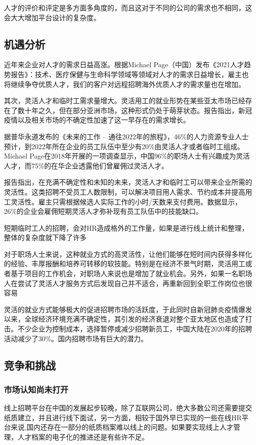 \documentclass[UTF8]{ctexart}
\begin{document}
人才的评价和评定是多方面多角度的，而且这对于不同的公司的需求也不相同，这会大大增加平台设计的复杂度。
\subsection{机遇分析}
近年来企业对人才的需求日益高涨。根据Michael Page（中国）发布《2021人才趋势报告》：技术、医疗保健与生命科学领域等领域对人才的需求日益增长，雇主也将继续争夺优质人才，我们的客户对远程招聘海外优质人才的需求量也在增加。

其次，灵活人才和临时工需求量增大。灵活用工的就业形势在某些亚太市场已经存在了数十年之久，但在部分亚洲市场，这种形式仍处于萌芽状态。报告指出，新冠疫情以及相关市场的不确定性加速了这一早存在的需求增长。

据普华永道发布的《未来的工作 – 通往2022年的旅程》，46\%的人力资源专业人士预计，到2022年所在企业的员工队伍中至少有20\%由灵活人才或者临时工组成。Michael Page在2018年开展的一项调查显示，中国96\%的职场人士有兴趣成为灵活人才，而75\%的在华企业透露他们曾雇佣过灵活人才。

报告指出，在充满不确定性和未知的未来，灵活人才和临时工可以带来企业所需的灵活性。这类招聘不受员工人数限制，可以解决项目用人需求、节约成本并提高用工灵活性。雇主只需根据候选人实际工作的小时/天数来支付费用。数据显示，26\%的企业会雇佣短期灵活人才弥补现有员工队伍中的技能缺口。

短期临时工人的招聘，会对HR造成格外的工作量，如果是进行线上统计和整理，整体的复杂度就下降了许多

对于职场人士来说，这种就业方式的高灵活性，让他们能够在短时间内获得多样化的经验、丰厚报酬和培养可转移的软技能。特别是在经济不景气时期，灵活用工或者基于项目的工作机会，对职场人来说也是增加了就业机会。另外，如果一名职场人在尝试了灵活人才服务方式后发现自己并不适合，再重新回到全职工作岗位也很容易


灵活的就业方式能够极大的促进招聘市场的活跃度，于此同时自新冠肺炎疫情爆发以来，全球经济环境充满不确定性，其引发的经济衰退对整个亚太地区也造成了打击。不少企业为控制成本，选择暂停或减少招聘新员工，中国大陆在2020年的招聘活动减少了30\%。国内招聘市场有巨大的潜力。
\subsection{竞争和挑战}
\subsubsection{市场认知尚未打开}
线上招聘平台在中国的发展起步较晚，除了互联网公司，绝大多数公司还需要提交纸质建立，并且进行线下面试，另一方面，相较于国外早已实现的一些在线HR平台来说,国内还存在一部分的纸质档案难以线上的问题。如果要实现线上人才管理，人才档案的电子化的推进还是有些许不足。
\end{document}
